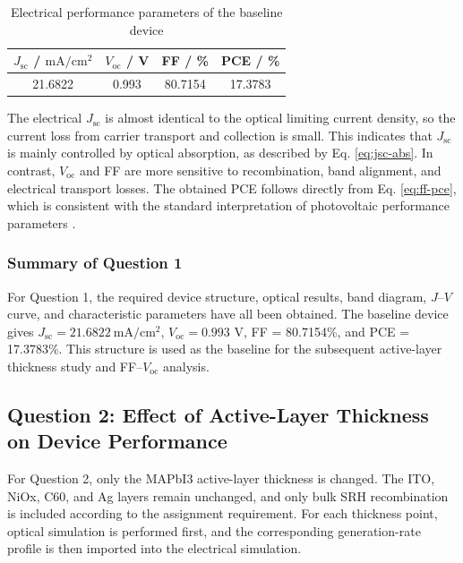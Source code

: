 \documentclass[12pt,a4paper,UTF8]{article}
\newcommand{\FloatBarrier}{\par\smallskip}
\begin{document}
\begin{table}[H]
    \centering
    \caption{Electrical performance parameters of the baseline device}
    \begin{tabular}{@{}cccc@{}}
        \toprule
        $J_\mathrm{sc}$ / $\mathrm{mA/cm^2}$ & $V_\mathrm{oc}$ / V & FF / \% & PCE / \% \\
        \midrule
        21.6822 & 0.993 & 80.7154 & 17.3783 \\
        \bottomrule
    \end{tabular}
\end{table}

The electrical $J_\mathrm{sc}$ is almost identical to the optical limiting current density, so the current loss from carrier transport and collection is small. This indicates that $J_\mathrm{sc}$ is mainly controlled by optical absorption, as described by Eq. \eqref{eq:jsc-abs}. In contrast, $V_\mathrm{oc}$ and FF are more sensitive to recombination, band alignment, and electrical transport losses. The obtained PCE follows directly from Eq. \eqref{eq:ff-pce}, which is consistent with the standard interpretation of photovoltaic performance parameters \cite{shockley1961,green2016}.

\FloatBarrier

\subsubsection{Summary of Question 1}
For Question 1, the required device structure, optical results, band diagram, $J$--$V$ curve, and characteristic parameters have all been obtained. The baseline device gives $J_\mathrm{sc}=21.6822\ \mathrm{mA/cm^2}$, $V_\mathrm{oc}=0.993$ V, FF = 80.7154\%, and PCE = 17.3783\%. This structure is used as the baseline for the subsequent active-layer thickness study and FF--$V_\mathrm{oc}$ analysis.

\subsection{Question 2: Effect of Active-Layer Thickness on Device Performance}
For Question 2, only the MAPbI3 active-layer thickness is changed. The ITO, NiOx, C60, and Ag layers remain unchanged, and only bulk SRH recombination is included according to the assignment requirement. For each thickness point, optical simulation is performed first, and the corresponding generation-rate profile is then imported into the electrical simulation.
\end{document}
